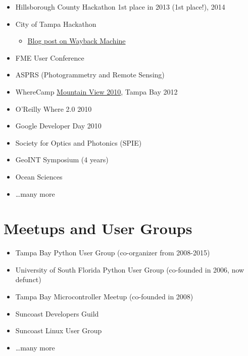 \documentclass{article}
\newenvironment{mitemize}
               {%
                 \setlength{\parskip}{3pt}
                 \setlength{\itemsep}{2.5pt plus 1pt}
                 \begin{itemize}}
               {\end{itemize}}
\begin{document}
\begin{mitemize}
\begin{mitemize}
    \item Tampa, Sarasota 2011, Orlando, Portland,  \ldots
    \end{mitemize}
  \item Hillsborough County Hackathon 1st place in 2013 (1st place!), 2014
  \item City of Tampa Hackathon
    \begin{mitemize}
    \item \href{https://web.archive.org/web/20120808120046/http://www.weogeo.com/blog/City_of_Tampa_Mayors_Hackathon.html}{Blog post on Wayback Machine}
    \end{mitemize}
  \item FME User Conference
  \item ASPRS (Photogrammetry and Remote Sensing)
  \item WhereCamp \href{https://conferences.oreilly.com/where/where2010/public/schedule/detail/14268}{Mountain View 2010}, Tampa Bay 2012
  \item O'Reilly Where 2.0 2010
  \item Google Developer Day 2010
  \item Society for Optics and Photonics (SPIE)
  \item GeoINT Symposium (4 years)
  \item Ocean Sciences
  \item \ldots many more
\end{mitemize}

\section*{Meetups and User Groups}
\begin{mitemize}
\item Tampa Bay Python User Group (co-organizer from 2008-2015)
\item University of South Florida Python User Group (co-founded in 2006, now defunct)
\item Tampa Bay Microcontroller Meetup (co-founded in 2008)
\item Suncoast Developers Guild
\item Suncoast Linux User Group
\item \ldots many more
\end{mitemize}
\end{document}
